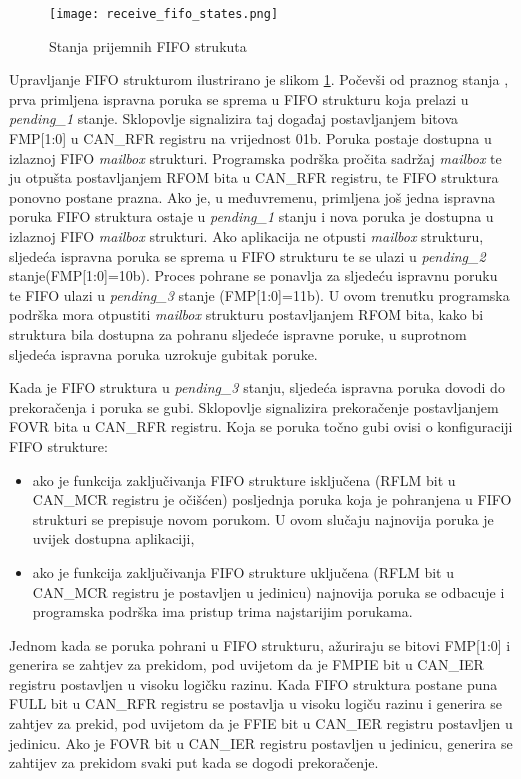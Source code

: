 \begin{figure}[H]
	\centering
	\texttt{[image: receive\_fifo\_states.png]}
	\caption{Stanja prijemnih FIFO strukuta \cite{l471_manual}}
	\label{fig:receive_fifo_states}
\end{figure}
Upravljanje FIFO strukturom ilustrirano je slikom \ref{fig:receive_fifo_states}. Počevši od praznog stanja , prva primljena ispravna poruka se sprema u FIFO strukturu koja prelazi u \textit{pending\_1} stanje. Sklopovlje signalizira taj događaj postavljanjem bitova FMP[1:0] u CAN\_RFR registru na vrijednost 01b. Poruka postaje dostupna u izlaznoj FIFO \textit{mailbox} strukturi. Programska podrška pročita sadržaj \textit{mailbox} te ju otpušta postavljanjem RFOM bita u CAN\_RFR registru, te FIFO struktura ponovno postane prazna. Ako je, u međuvremenu, primljena još jedna ispravna poruka FIFO struktura ostaje u \textit{pending\_1} stanju i nova poruka je dostupna u izlaznoj FIFO \textit{mailbox} strukturi. Ako aplikacija ne otpusti \textit{mailbox} strukturu, sljedeća ispravna poruka se sprema u FIFO strukturu te se ulazi u \textit{pending\_2} stanje(FMP[1:0]=10b). Proces pohrane se ponavlja za sljedeću ispravnu poruku te FIFO ulazi u \textit{pending\_3} stanje (FMP[1:0]=11b). U ovom trenutku programska podrška mora otpustiti \textit{mailbox} strukturu postavljanjem RFOM bita, kako bi struktura bila dostupna za pohranu sljedeće ispravne poruke, u suprotnom sljedeća ispravna poruka uzrokuje gubitak poruke.

Kada je FIFO struktura u \textit{pending\_3} stanju, sljedeća ispravna poruka dovodi do prekoračenja i poruka se gubi. Sklopovlje signalizira prekoračenje postavljanjem FOVR bita u CAN\_RFR registru. Koja se poruka točno gubi ovisi o konfiguraciji FIFO strukture:
\begin{itemize}
	\item ako je funkcija zaključivanja FIFO strukture isključena (RFLM bit u CAN\_MCR registru je očišćen) posljednja poruka koja je pohranjena u FIFO strukturi se prepisuje novom porukom. U ovom slučaju najnovija poruka je uvijek dostupna aplikaciji,
	\item ako je funkcija zaključivanja FIFO strukture uključena (RFLM bit u CAN\_MCR registru je postavljen u jedinicu) najnovija poruka se odbacuje i programska podrška ima pristup trima najstarijim porukama.
\end{itemize}

Jednom kada se poruka pohrani u FIFO strukturu, ažuriraju se bitovi FMP[1:0] i generira se zahtjev za prekidom, pod uvijetom da je FMPIE bit u CAN\_IER registru postavljen u visoku logičku razinu. Kada FIFO struktura postane puna FULL bit u CAN\_RFR registru se postavlja u visoku logiču razinu i generira se zahtjev za prekid, pod uvijetom da je FFIE bit u CAN\_IER registru postavljen u jedinicu. Ako je FOVR bit u CAN\_IER registru postavljen u jedinicu, generira se zahtijev za prekidom svaki put kada se dogodi prekoračenje.

